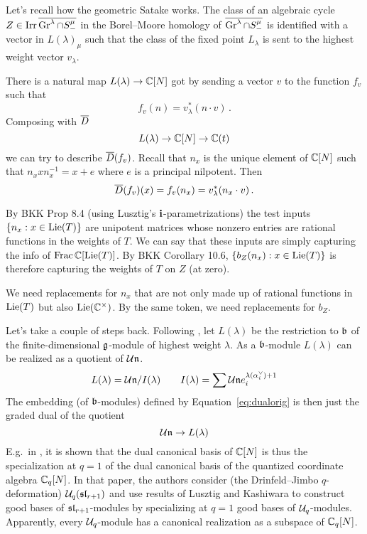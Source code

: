 \documentclass[11pt]{article}
\begin{document}
Let's recall how the geometric Satake works. The class of an algebraic cycle $Z\in\irr\overline{\Gr^\lambda\cap S^\mu_-}$ in the Borel--Moore homology of $\overline{\Gr^\lambda\cap S^\mu_-}$ is identified with a vector in $L(\lambda)_\mu$ such that the class of the fixed point $L_\lambda$ is sent to the highest weight vector $v_\lambda$. 

There is a natural map $L(\lambda) \to \CC[N]$ got by sending a vector $v$ to the function $f_v$ such that 
\begin{equation}
    \label{eq:dualorig}
f_v(n) = v_\lambda^\ast(n\cdot v)\,.
\end{equation}
Composing with $\barD$ 
$$
L(\lambda) \to \CC[N] \to \CC(t)
$$ 
we can try to describe $\barD(f_v)$.
% 
Recall that $n_x$ is the unique element of $\CC[N]$ such that $n_x x n_x^{-1} = x + e$ where $e$ is a principal nilpotent. Then 
% 
$$
\barD(f_v) (x) = f_v(n_x) = v_\lambda^\ast (n_x \cdot v)\,. 
$$

By BKK Prop 8.4 (using Lusztig's $\vi$-parametrizations) the test inputs $\{n_x : x \in \lie(T)\}$ are unipotent matrices whose nonzero entries are rational functions in the weights of $T$. We can say that these inputs are simply capturing the info of $\Frac \CC[\lie(T)]$. 
By BKK Corollary 10.6, $\{b_Z(n_x) : x \in \lie(T)\}$ is therefore capturing the weights of $T$ on $Z$ (at zero). 
% 

We need replacements for $n_x$ that are not only made up of rational functions in $\lie(T)$ but also $\lie(\CC^\times)$. 
% 
By the same token, we need replacements for $b_Z$. 
% 

Let's take a couple of steps back. Following \cite{berenstein2006geometric}, let $L(\lambda)$ be the restriction to $\fb$ of the finite-dimensional $\g$-module of highest weight $\lambda$. As a $\fb$-module $L(\lambda)$ can be realized as a quotient of $\cU\n$.
\begin{equation}
    L(\lambda) = \cU \n / I(\lambda) \qquad I(\lambda) = \sum \cU\n e_i^{\lambda(\alpha_i^\vee)+1}
\end{equation} 
The embedding (of $\fb$-modules) defined by Equation~\ref{eq:dualorig} is then just the graded dual of the quotient 
\[
\cU\n \to L(\lambda)    
\]
E.g.\ in \cite{berenstein1996canonical}, it is shown that the dual canonical basis of $\CC[N]$ is thus the specialization at $q = 1$ of the dual canonical basis of the quantized coordinate algebra $\CC_q[N]$. In that paper, the authors consider (the Drinfeld--Jimbo $q$-deformation) $\cU_q(\sl_{r+1})$ and use results of Lusztig and Kashiwara to construct good bases of $\sl_{r+1}$-modules by specializing at $q=1$ good bases of $\cU_q$-modules. Apparently, every $\cU_q$-module has a canonical realization as a subspace of $\CC_q[N]$.  
\end{document}
